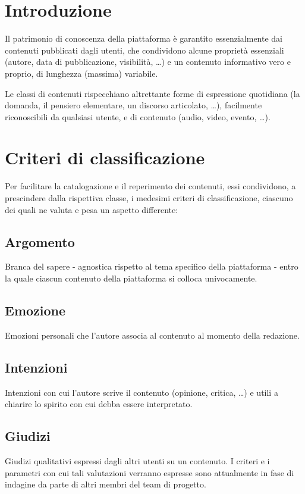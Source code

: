 \documentclass[10pt,a4paper,headinclude,footinclude,hidelinks]{scrreprt} %
\begin{document}
	\section{Introduzione}
	Il patrimonio di conoscenza della piattaforma è garantito essenzialmente dai contenuti pubblicati dagli utenti, che condividono alcune proprietà essenziali (autore, data di pubblicazione, visibilità, \ldots) e un contenuto informativo vero e proprio, di lunghezza (massima) variabile.

	Le classi di contenuti rispecchiano altrettante forme di espressione quotidiana (la domanda, il pensiero elementare, un discorso articolato, \ldots), facilmente riconoscibili da qualsiasi utente, e di contenuto (audio, video, evento, \ldots).

	\section{Criteri di classificazione}
	Per facilitare la catalogazione e il reperimento dei contenuti, essi condividono, a prescindere dalla rispettiva classe, i medesimi criteri di classificazione, ciascuno dei quali ne valuta e pesa un aspetto differente:
	\subsection{Argomento}
	Branca del sapere - agnostica rispetto al tema specifico della piattaforma - entro la quale ciascun contenuto della piattaforma si colloca univocamente.
	\subsection{Emozione}
	Emozioni personali che l'autore associa al contenuto al momento della redazione.
	\subsection{Intenzioni}
	Intenzioni con cui l'autore scrive il contenuto (opinione, critica, \ldots) e utili a chiarire lo spirito con cui debba essere interpretato.
	\subsection{Giudizi}
	Giudizi qualitativi espressi dagli altri utenti su un contenuto. I criteri e i parametri con cui tali valutazioni verranno espresse sono attualmente in fase di indagine da parte di altri membri del team di progetto.
\end{document}
